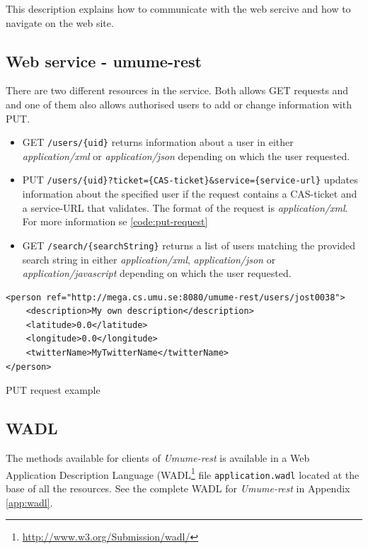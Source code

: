 \documentclass[titlepage, twocolumn, a4paper, 10pt]{article}
\begin{document}
This description explains how to communicate with the web sercive and
how to navigate on the web site.

\subsection{Web service - umume-rest}
There are two different resources in the service. Both allows GET requests and
and one of them also allows
authorised users to add or change information with PUT.
\begin{itemize}
    \item GET \verb!/users/{uid}! returns information about a user in either
    \textit{application/xml} or \textit{application/json} depending on which the user 
    requested. 
    \item PUT \verb!/users/{uid}?ticket={CAS-ticket}&service={service-url}! updates information about the specified user if the request contains a CAS-ticket and a service-URL that validates. The
    format of the request is \textit{application/xml}. For more information se \ref{code:put-request}
    \item GET \verb!/search/{searchString}! returns a list of users matching the provided 
    search string in either
    \textit{application/xml}, \textit{application/json} or \textit{application/javascript}
     depending on which the user requested.
\end{itemize}

\begin{code}
  \begin{footnotesize}
\begin{verbatim}
<person ref="http://mega.cs.umu.se:8080/umume-rest/users/jost0038">
    <description>My own description</description>
    <latitude>0.0</latitude>
    <longitude>0.0</longitude>
    <twitterName>MyTwitterName</twitterName>
</person>
\end{verbatim}
  \end{footnotesize}
  \caption{PUT request example}\label{code:put-request}
\end{code}

\subsection{WADL}

The methods available for clients of \textit{Umume-rest} is available in a  Web Application Description Language (WADL\footnote{\url{http://www.w3.org/Submission/wadl/}} file \texttt{application.wadl} located at the base of all the resources. See the complete WADL for \textit{Umume-rest} in Appendix \ref{app:wadl}.
\end{document}
